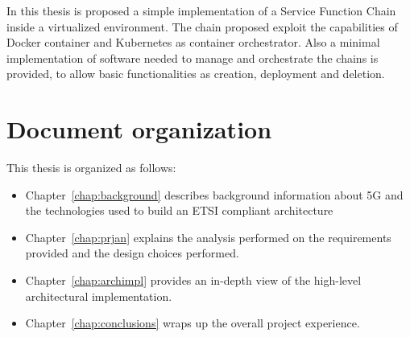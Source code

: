 In this thesis is proposed a simple implementation of a Service Function Chain
inside a virtualized environment. The chain proposed exploit the capabilities
of Docker container and Kubernetes as container orchestrator. Also a minimal
implementation of software needed to manage and orchestrate the chains is
provided, to allow basic functionalities as creation, deployment and deletion. 


 \section{Document organization}
 
 This thesis is organized as follows:
 \begin{itemize}
  \item Chapter~\ref{chap:background} describes background information about 5G 
and the technologies used to build an ETSI compliant architecture
  \item Chapter~\ref{chap:prjan} explains the analysis performed on the 
requirements provided and the design choices performed.
  \item Chapter~\ref{chap:archimpl} provides an in-depth view of the 
high-level architectural implementation.
  \item Chapter~\ref{chap:conclusions} wraps up the overall project experience.
 \end{itemize}